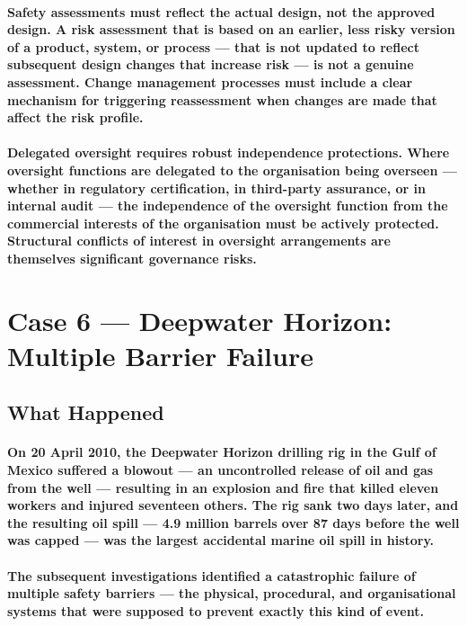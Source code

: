 \paragraph{\textbf{Safety assessments must reflect the actual design, not the approved design}. A risk assessment that is based on an earlier, less risky version of a product, system, or process — that is not updated to reflect subsequent design changes that increase risk — is not a genuine assessment. Change management processes must include a clear mechanism for triggering reassessment when changes are made that affect the risk profile.}
\paragraph{\textbf{Delegated oversight requires robust independence protections}. Where oversight functions are delegated to the organisation being overseen — whether in regulatory certification, in third-party assurance, or in internal audit — the independence of the oversight function from the commercial interests of the organisation must be actively protected. Structural conflicts of interest in oversight arrangements are themselves significant governance risks.}

\section{Case 6 — Deepwater Horizon: Multiple Barrier Failure}

\subsection{What Happened}
\paragraph{On 20 April 2010, the Deepwater Horizon drilling rig in the Gulf of Mexico suffered a blowout — an uncontrolled release of oil and gas from the well — resulting in an explosion and fire that killed eleven workers and injured seventeen others. The rig sank two days later, and the resulting oil spill — 4.9 million barrels over 87 days before the well was capped — was the largest accidental marine oil spill in history.}
\paragraph{The subsequent investigations identified a catastrophic failure of multiple safety barriers — the physical, procedural, and organisational systems that were supposed to prevent exactly this kind of event.}

